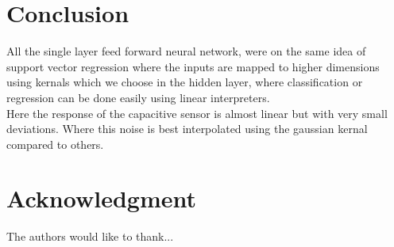 \documentclass[conference]{IEEEtran}
\begin{document}
\section{Conclusion}
All the single layer feed forward neural network, were on the same idea of support vector regression where the 
inputs are mapped to higher dimensions using kernals which we choose in the hidden layer, where classification or regression can be done easily using linear interpreters. \\
Here the response of the capacitive sensor is almost linear but with very small deviations. Where this noise is best interpolated using the gaussian kernal compared to others.\\





\section*{Acknowledgment}


The authors would like to thank...






\end{document}
